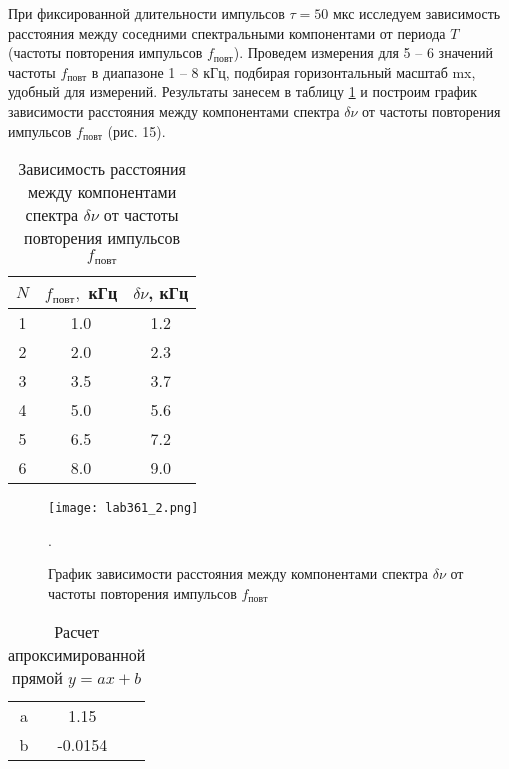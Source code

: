 \documentclass[a4paper, 14pt]{extarticle}%
\begin{document}
  	При фиксированной длительности импульсов  $ \tau = 50 $ мкс исследуем зависимость расстояния между соседними спектральными компонентами
  	от периода $ T $ (частоты повторения импульсов $ f_{повт} $). Проведем измерения для 5 -- 6 значений частоты $ f_{повт} $ в диапазоне 1 -- 8 кГц, подбирая горизонтальный масштаб mx, удобный для измерений. Результаты занесем в таблицу \ref{B_table} и построим график зависимости расстояния между компонентами спектра $ \delta \nu $ от частоты повторения импульсов $ f_{повт} $ (рис. 15). 
  
  	\begin{table}[]
  		\caption{Зависимость расстояния между компонентами спектра $ \delta \nu $ от частоты повторения импульсов $ f_{повт} $}
  		\begin{center}
  			\begin{tabular}{|c|c|c|}
  				\hline
  				$ N $  & $ f_{повт}, $ кГц  & $ \delta \nu $, кГц \\
  				\hline
  				1 & 1.0 & 1.2 \\
  					\hline
  				2 & 2.0 & 2.3 \\
  					\hline
  				3 & 3.5 & 3.7 \\
  					\hline
  				4 & 5.0 & 5.6 \\
  					\hline
  				5 & 6.5 & 7.2 \\
  					\hline
  				6 & 8.0 & 9.0 \\
  				\hline
  			\end{tabular}
  		\end{center}
  		\label{B_table}
  	\end{table}
  	
  	\begin{figure}[h!]
  		\label{B_graf}
  		\texttt{[image: lab361\_2.png]}
  		\caption{График зависимости расстояния между компонентами спектра $ \delta \nu $ от частоты повторения импульсов $ f_{повт} $}. 
  	\end{figure}
  	
  	
  		\begin{table}[h!]
  		\centering
  		\caption{Расчет апроксимированной прямой $ y = ax +b $}
  		\begin{tabular}{c|cc}
  			\text{} & \text{Estimate} & \\
  			\hline
  			a & 1.15 & \\
  			b & -0.0154 &  \\
  			\hline
  		\end{tabular}
  	\end{table}
  	
\end{document}
